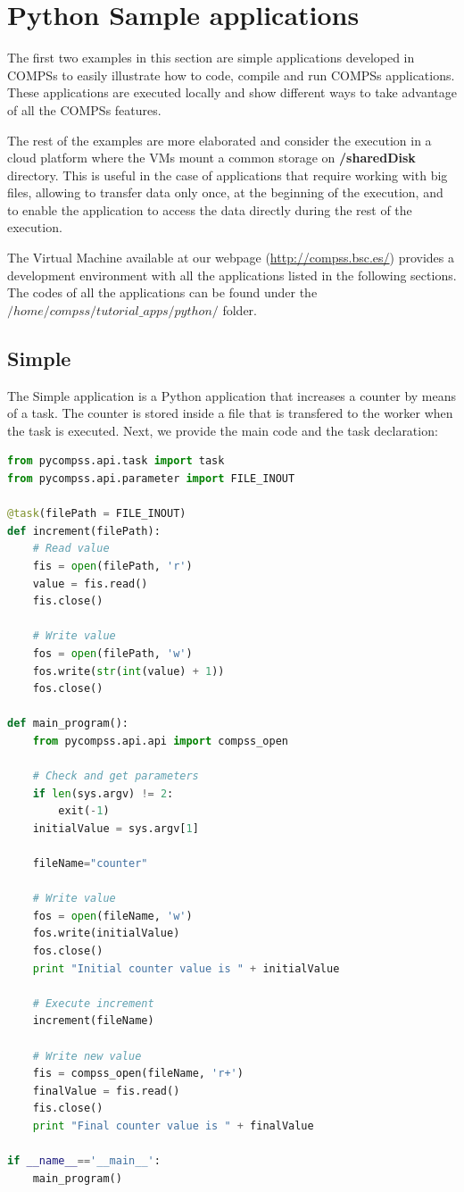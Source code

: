 \section{Python Sample applications}
\label{sec:PythonSampleApps}

The first two examples in this section are simple applications developed in COMPSs to easily illustrate how to code,
compile and run COMPSs applications. These applications are executed locally and show different ways to take advantage
of all the COMPSs features. 

The rest of the examples are more elaborated and consider the execution in a cloud platform where the VMs mount a common 
storage on \textbf{/sharedDisk} directory. This is useful in the case of applications that require working 
with big files, allowing to transfer data only once, at the beginning of the execution, and to enable 
the application to access the data directly during the rest of the execution.

The Virtual Machine available at our webpage (\url{http://compss.bsc.es/}) provides a development environment with
all the applications listed in the following sections. The codes of all the applications can be found under the 
$/home/compss/tutorial\_apps/python/$ folder. 

\subsection{Simple}
The Simple application is a Python application that increases a counter by means of a task. The counter is stored inside a file that 
is transfered to the worker when the task is executed. Next, we provide the main code and the task declaration:

\begin{lstlisting}[language=python]
from pycompss.api.task import task
from pycompss.api.parameter import FILE_INOUT

@task(filePath = FILE_INOUT)
def increment(filePath):
    # Read value
    fis = open(filePath, 'r')
    value = fis.read()
    fis.close()

    # Write value
    fos = open(filePath, 'w')
    fos.write(str(int(value) + 1))
    fos.close()

def main_program():
    from pycompss.api.api import compss_open

    # Check and get parameters
    if len(sys.argv) != 2:
        exit(-1)
    initialValue = sys.argv[1]
    
    fileName="counter"

    # Write value
    fos = open(fileName, 'w')
    fos.write(initialValue)
    fos.close()
    print "Initial counter value is " + initialValue

    # Execute increment
    increment(fileName)

    # Write new value
    fis = compss_open(fileName, 'r+')
    finalValue = fis.read()
    fis.close()
    print "Final counter value is " + finalValue
    
if __name__=='__main__':
    main_program()

\end{lstlisting}

